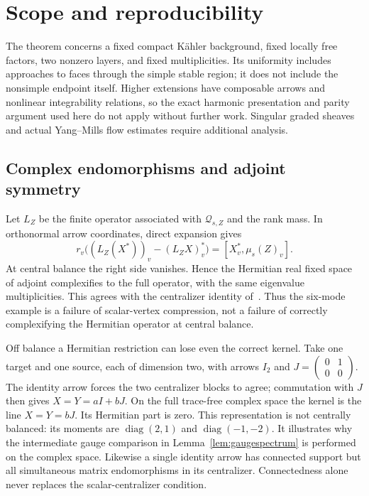 \section{Scope and reproducibility}\label{sec:scope}

The theorem concerns a fixed compact Kähler background, fixed locally
free factors, two nonzero layers, and fixed multiplicities. Its
uniformity includes approaches to faces through the simple stable
region; it does not include the nonsimple endpoint itself. Higher
extensions have composable arrows and nonlinear integrability
relations, so the exact harmonic presentation and parity argument
used here do not apply without further work. Singular graded sheaves
and actual Yang--Mills flow estimates require additional analysis.

\subsection{Complex endomorphisms and adjoint symmetry}
Let $L_Z$ be the finite operator associated with
$\mathcal Q_{s,Z}$ and the rank mass. In orthonormal arrow
coordinates, direct expansion gives
\begin{equation}\label{eq:adjointsymmetry}
r_v\bigl((L_Z(X^*))_v-(L_ZX)_v^*\bigr)
=[X_v^*,\mu_s(Z)_v].
\end{equation}
At central balance the right side vanishes. Hence the Hermitian
real fixed space of adjoint complexifies to the full operator,
with the same eigenvalue multiplicities. This agrees with the
centralizer identity of~\cite[\S5.2, Proposition~5.3]{hkkp2023}.
Thus the six-mode example is a failure of scalar-vertex compression,
not a failure of correctly complexifying the Hermitian operator at
central balance.

Off balance a Hermitian restriction can lose even the correct
kernel. Take one target and one source, each of dimension two,
with arrows $I_2$ and
$J=\left(\begin{smallmatrix}0&1\\0&0\end{smallmatrix}\right)$.
The identity arrow forces the two centralizer blocks to agree;
commutation with $J$ then gives $X=Y=aI+bJ$. On the full
trace-free complex space the kernel is the line $X=Y=bJ$.
Its Hermitian part is zero. This representation is not centrally
balanced: its moments are $\operatorname{diag}(2,1)$ and
$\operatorname{diag}(-1,-2)$. It illustrates why the intermediate
gauge comparison in Lemma~\ref{lem:gaugespectrum} is performed
on the complex space. Likewise a single identity arrow has
connected support but all simultaneous matrix endomorphisms in
its centralizer. Connectedness alone never replaces the
scalar-centralizer condition.

